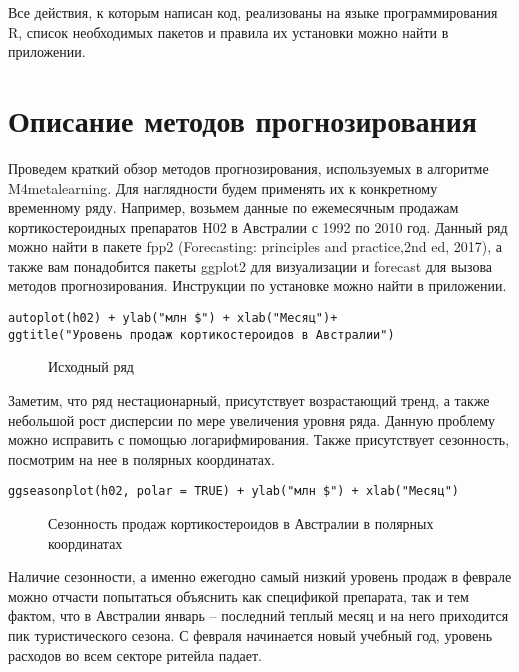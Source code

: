 \documentclass[a4paper,12pt]{article}
\theoremstyle{plain} %
\theoremstyle{definition} %
\theoremstyle{remark} %
\begin{document}
Все действия, к которым написан код, реализованы на языке программирования R, список необходимых пакетов и правила их установки можно найти в приложении.

\newpage

\section{Описание методов прогнозирования}
Проведем краткий обзор методов прогнозирования, используемых в алгоритме M4metalearning.
Для наглядности будем применять их к конкретному временному ряду.
Например, возьмем данные по ежемесячным продажам кортикостероидных препаратов H02 в Австралии с 1992 по 2010 год.
Данный ряд можно найти в пакете fpp2 (Forecasting: principles and practice,2nd ed, 2017), а также вам понадобится пакеты ggplot2 для визуализации и forecast для вызова методов прогнозирования. Инструкции по установке можно найти в приложении.

\begin{verbatim}
autoplot(h02) + ylab("млн $") + xlab("Месяц")+
ggtitle("Уровень продаж кортикостероидов в Австралии")
\end{verbatim}

\begin{figure}[H]
  \noindent{}
  \caption{Исходный ряд}
  \label{figCurves}
\end{figure}

Заметим, что ряд нестационарный, присутствует возрастающий тренд, а также небольшой рост дисперсии по мере увеличения уровня ряда.
Данную проблему можно исправить с помощью логарифмирования.
Также присутствует сезонность, посмотрим на нее в полярных координатах.

\begin{verbatim}
ggseasonplot(h02, polar = TRUE) + ylab("млн $") + xlab("Месяц")
\end{verbatim}

\begin{figure}[H]
  \noindent{}
  \caption{Сезонность продаж кортикостероидов в Австралии в полярных координатах}
  \label{figCurves}
\end{figure}

Наличие сезонности, а именно ежегодно самый низкий уровень продаж в феврале можно отчасти попытаться объяснить как спецификой препарата, так и тем фактом, что в Австралии январь -- последний теплый месяц и на него приходится пик туристического сезона.
С февраля начинается новый учебный год, уровень расходов во всем секторе ритейла падает.
\end{document}
